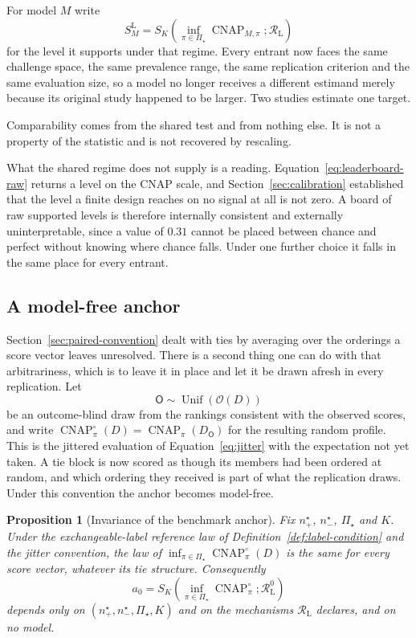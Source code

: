 \documentclass[11pt]{article}
\newcommand{\CNAP}{\operatorname{CNAP}}
\newcommand{\Regime}{\mathcal{R}}
\newcommand{\PSet}{\Pi_\star}
\newcommand{\Rank}{\mathsf{O}}
\newcommand{\CNAPj}{\CNAP^{\circ}}
\newcommand{\RegimeL}{\Regime_{\mathrm{L}}}
\newcommand{\SLead}{S^{\mathrm{L}}}
\newcommand{\Unif}{\operatorname{Unif}}
\newtheorem{proposition}{Proposition}
\theoremstyle{remark}
\begin{document}
For model $M$ write
\begin{equation}
\SLead_M
=
S_K
\left(
\inf_{\pi\in\PSet}\CNAP_{M,\pi};
\RegimeL
\right)
\label{eq:leaderboard-raw}
\end{equation}
for the level it supports under that regime. Every entrant now faces the same challenge space, the same prevalence range, the same replication criterion and the same evaluation size, so a model no longer receives a different estimand merely because its original study happened to be larger. Two studies estimate one target.

Comparability comes from the shared test and from nothing else. It is not a property of the statistic and is not recovered by rescaling.

What the shared regime does not supply is a reading. Equation~\eqref{eq:leaderboard-raw} returns a level on the CNAP scale, and Section~\ref{sec:calibration} established that the level a finite design reaches on no signal at all is not zero. A board of raw supported levels is therefore internally consistent and externally uninterpretable, since a value of $0.31$ cannot be placed between chance and perfect without knowing where chance falls. Under one further choice it falls in the same place for every entrant.

\subsection{A model-free anchor}
\label{sec:common-anchor}

Section~\ref{sec:paired-convention} dealt with ties by averaging over the orderings a score vector leaves unresolved. There is a second thing one can do with that arbitrariness, which is to leave it in place and let it be drawn afresh in every replication. Let
\[
\Rank\sim\Unif\left(\mathcal{O}(D)\right)
\]
be an outcome-blind draw from the rankings consistent with the observed scores, and write $\CNAPj_\pi(D)=\CNAP_\pi(D_{\Rank})$ for the resulting random profile. This is the jittered evaluation of Equation~\eqref{eq:jitter} with the expectation not yet taken. A tie block is now scored as though its members had been ordered at random, and which ordering they received is part of what the replication draws. Under this convention the anchor becomes model-free.

\begin{proposition}[Invariance of the benchmark anchor]
\label{prop:anchor-invariance}
Fix $n^\star_+$, $n^\star_-$, $\PSet$ and $K$. Under the exchangeable-label reference law of Definition~\ref{def:label-condition} and the jitter convention, the law of $\inf_{\pi\in\PSet}\CNAPj_\pi(D)$ is the same for every score vector, whatever its tie structure. Consequently
\begin{equation}
a_0
=
S_K
\left(
\inf_{\pi\in\PSet}\CNAPj_\pi;
\RegimeL^{0}
\right)
\label{eq:common-anchor}
\end{equation}
depends only on $(n^\star_+,n^\star_-,\PSet,K)$ and on the mechanisms $\RegimeL$ declares, and on no model.
\end{proposition}
\end{document}
